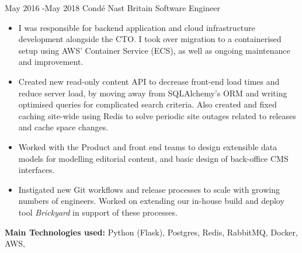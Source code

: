 \documentclass[10pt]{article} %
\begin{document}
\jobheader
{May 2016 -}{May 2018}
{Condé Nast Britain}
{Software Engineer}
\vspace{-1cm}
  \begin{itemize}

  \item I was responsible for backend application and cloud infrastructure development
        alongside the CTO. I took over migration to a containerised setup using AWS' Container Service (ECS), as well as ongoing maintenance and improvement.

  \item Created new read-only content API to decrease front-end load times and
        reduce server load, by moving away from SQLAlchemy's ORM and writing
        optimised queries for complicated search criteria. Also created and fixed
        caching site-wide using Redis to solve periodic site outages related to
        releases and cache space changes.

  \item Worked with the Product and front end teams to design extensible data models
        for modelling editorial content, and basic design of back-office CMS
        interfaces.

  \item Instigated new Git workflows and release processes to scale with growing
        numbers of engineers. Worked on extending our in-house build and deploy
        tool \textit{Brickyard} in support of these processes.

  \end{itemize}

  \textbf{Main Technologies used:}
  Python (Flask),
  Postgres, Redis, RabbitMQ, Docker, AWS,


\clearpage
\end{document}
